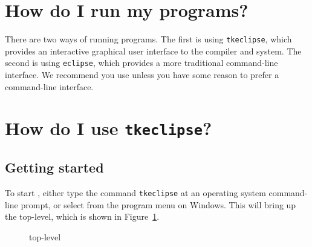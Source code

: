 \section{How do I run my {\eclipse} programs?}
There are two ways of running {\eclipse} programs.
The first is using \texttt{tkeclipse}, which provides an interactive graphical
user interface to the {\eclipse} compiler and system.
The second is using \texttt{eclipse}, which provides a more traditional
command-line interface.
We recommend you use {\tkeclipse} unless you have some reason to prefer a
command-line interface.

\section{How do I use \texttt{tkeclipse}?}

\subsection{Getting started}

To start {\tkeclipse}, either type the command \texttt{tkeclipse} at an
operating system command-line prompt, or select {\tkeclipse} from the
program menu on Windows.
This will bring up the {\tkeclipse} top-level, which is shown in
Figure~\ref{tktop}.

\begin{figure}[bt]
\begin{center}
\end{center}
\caption{{\tkeclipse} top-level}
\label{tktop}
\end{figure}

